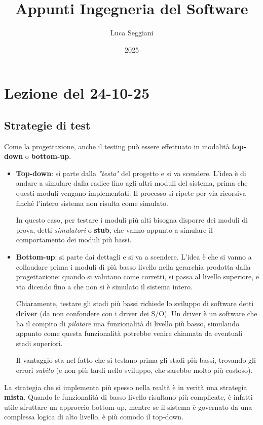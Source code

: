 \documentclass[a4paper,11pt]{article}
\title{Appunti Ingegneria del Software}
\author{Luca Seggiani}
\date{2025}
\begin{document}
\section{Lezione del 24-10-25}

\thispagestyle{empty}
\pagestyle{fancy}

\subsection{Strategie di test}
Come la progettazione, anche il testing può essere effettuato in modalità \textbf{top-down} o \textbf{bottom-up}.

\begin{itemize}
	\item \textbf{Top-down}: si parte dalla \textit{"testa"} del progetto e si va scendere. L'idea è di andare a simulare dalla radice fino agli altri moduli del sistema, prima che questi moduli vengano implementati. Il processo si ripete per via ricorsiva finché l'intero sistema non risulta come simulato.

		In questo caso, per testare i moduli più alti bisogna disporre dei moduli di prova, detti \textit{simulatori} o \textbf{stub}, che vanno appunto a simulare il comportamento dei moduli più bassi.
		
	\item \textbf{Bottom-up}: si parte dai dettagli e si va a scendere. L'idea è che si vanno a collaudare prima i moduli di più basso livello nella gerarchia prodotta dalla progettazione: quando si valutano come corretti, si passa al livello superiore, e via dicendo fino a che non si è simulato il sistema intero.

	Chiaramente, testare gli stadi più bassi richiede lo sviluppo di software detti \textbf{driver} (da non confondere con i driver dei S/O). Un driver è un software che ha il compito di \textit{pilotare} una funzionalità di livello più basso, simulando appunto come questa funzionalità potrebbe venire chiamata da eventuali stadi superiori.

	Il vantaggio sta nel fatto che si testano prima gli stadi più bassi, trovando gli errori \textit{subito} (e non più tardi nello sviluppo, che sarebbe molto più costoso). 
\end{itemize}

La strategia che si implementa più spesso nella realtà è in verità una strategia \textbf{mista}.
Quando le funzionalità di basso livello risultano più complicate, è infatti utile sfruttare un approccio bottom-up, mentre se il sistema è governato da una complessa logica di alto livello, è più comodo il top-down.
\end{document}
